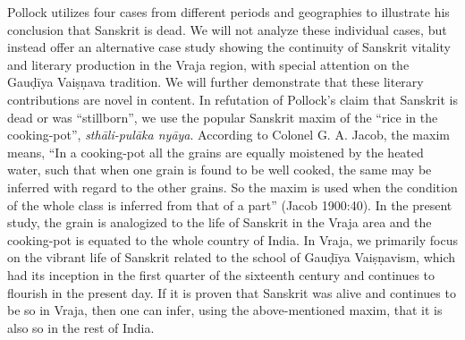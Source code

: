 Pollock utilizes four cases from different periods and geographies to illustrate his conclusion that Sanskrit is dead. We will not analyze these individual cases, but instead offer an alternative case study showing the continuity of Sanskrit vitality and literary production in the Vraja region, with special attention on the Gauḍīya Vaiṣṇava tradition. We will further demonstrate that these literary contributions are novel in content. In refutation of Pollock’s claim that Sanskrit is dead or was “stillborn”, we use the popular Sanskrit maxim of the “rice in the cooking-pot”, {\sl sthāli-pulāka nyāya}. According to Colonel G. A. Jacob, the maxim means, “In a cooking-pot all the grains are equally moistened by the heated water, such that when one grain is found to be well cooked, the same may be inferred with regard to the other grains. So the maxim is used when the condition of the whole class is inferred from that of a part” (Jacob 1900:40). In the present study, the grain is analogized to the life of Sanskrit in the Vraja area and the cooking-pot is equated to the whole country of India. In Vraja, we primarily focus on the vibrant life of Sanskrit related to the school of Gauḍīya Vaiṣṇavism,  which had its inception in the first quarter of the sixteenth century and continues to flourish in the present day. If it is proven that Sanskrit was alive and continues to be so in Vraja, then one can infer, using the above-mentioned maxim, that it is also so in the rest of India. 

